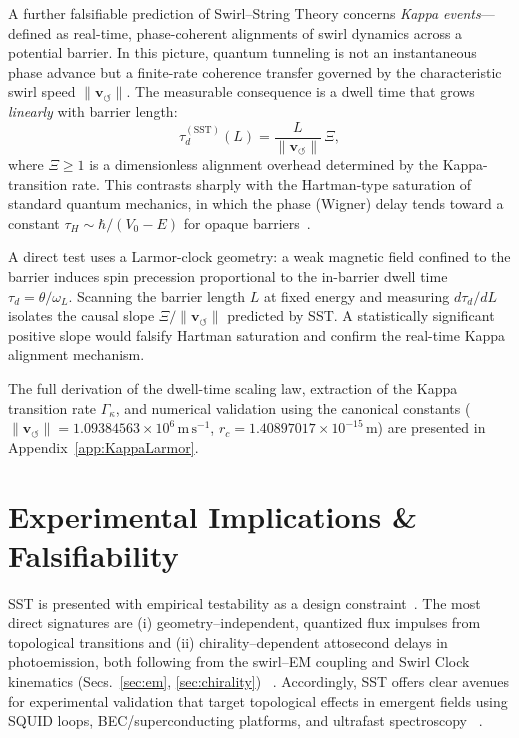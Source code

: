 \documentclass[10pt,reprint,aps,onecolumn,nofootinbib]{revtex4-2}
\begin{document}
        A further falsifiable prediction of Swirl--String Theory concerns \emph{Kappa events}---defined as real-time, phase-coherent alignments of swirl dynamics across a potential barrier. In this picture, quantum tunneling is not an instantaneous phase advance but a finite-rate coherence transfer governed by the characteristic swirl speed $\lVert\mathbf{v}_{\!\boldsymbol{\circlearrowleft}}\rVert$. The measurable consequence is a dwell time that grows \emph{linearly} with barrier length:
        \begin{equation}
            \tau^{(\mathrm{SST})}_d(L) = \frac{L}{\lVert\mathbf{v}_{\!\boldsymbol{\circlearrowleft}}\rVert}\,\Xi,
        \end{equation}
        where $\Xi \ge 1$ is a dimensionless alignment overhead determined by the Kappa-transition rate. This contrasts sharply with the Hartman-type saturation of standard quantum mechanics, in which the phase (Wigner) delay tends toward a constant $\tau_H \sim \hbar/(V_0-E)$ for opaque barriers~\cite{Buttiker1983,HaugeStovneng1989,Winful2006}.

        A direct test uses a Larmor-clock geometry: a weak magnetic field confined to the barrier induces spin precession proportional to the in-barrier dwell time $\tau_d = \theta/\omega_L$. Scanning the barrier length $L$ at fixed energy and measuring $d\tau_d/dL$ isolates the causal slope $\Xi/\lVert\mathbf{v}_{\!\boldsymbol{\circlearrowleft}}\rVert$ predicted by SST. A statistically significant positive slope would falsify Hartman saturation and confirm the real-time Kappa alignment mechanism.

        The full derivation of the dwell-time scaling law, extraction of the Kappa transition rate $\Gamma_\kappa$, and numerical validation using the canonical constants ($\lVert\mathbf{v}_{\!\boldsymbol{\circlearrowleft}}\rVert = 1.09384563\times10^{6}\,\mathrm{m\,s^{-1}}$, $r_c = 1.40897017\times10^{-15}\,\mathrm{m}$) are presented in Appendix~\ref{app:KappaLarmor}.


    \section{Experimental Implications \& Falsifiability}\label{sec:falsifiability}
        SST is presented with empirical testability as a design constraint~\cite{Hossenfelder2018}. The most direct signatures are (i) geometry–independent, quantized flux impulses from topological transitions and (ii) chirality–dependent attosecond delays in photoemission, both following from the swirl–EM coupling and Swirl Clock kinematics (Secs.~\ref{sec:em}, \ref{sec:chirality})~ \cite{EM_G}. Accordingly, SST offers clear avenues for experimental validation that target topological effects in emergent fields using SQUID loops, BEC/superconducting platforms, and ultrafast spectroscopy~ \cite{EM_G}.
\end{document}
